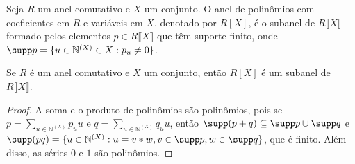 \begin{definition}
    Seja $R$ um anel comutativo e $X$ um conjunto. O anel de polinômios com coeficientes em $R$ e variáveis em $X$, denotado por $R[X]$, é o subanel de $R\llbracket X \rrbracket$ formado pelos elementos $p\in R\llbracket X \rrbracket$ que têm suporte finito, onde $\supp p=\{u \in \mathbb N^{(X)} \in X: p_u\neq 0\}$.
\end{definition}

\begin{lemma}
    Se $R$ é um anel comutativo e $X$ um conjunto, então $R[X]$ é um subanel de $R\llbracket X \rrbracket$.
\end{lemma}
\begin{proof}
    A soma e o produto de polinômios são polinômios, pois se $p=\sum_{u \in \mathbb N^{(X)}}p_u u$ e $q=\sum_{u \in \mathbb N^{(X)}}q_u u$, então $\supp(p+q)\subseteq\supp p\cup \supp q$ e $\supp(pq)=\{u \in \mathbb N^{(X)}: u=v*w, v\in \supp p, w\in \supp q\}$, que é finito. Além disso, as séries $0$ e $1$ são polinômios.
\end{proof}
